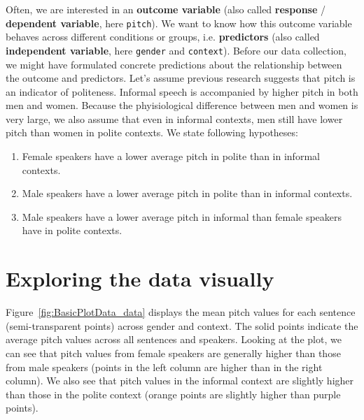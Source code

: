 \documentclass[nobib]{tufte-handout}
\begin{document}
Often, we are interested in an \textbf{outcome variable} (also called \textbf{response} / \textbf{dependent variable}, here \texttt{pitch}). We want to know how this outcome variable behaves
across different conditions or groups, i.e. \textbf{predictors} (also called \textbf{independent variable}, here \texttt{gender} and \texttt{context}). Before our data collection,
we might have formulated concrete predictions about the relationship between the outcome and predictors. Let's assume previous research suggests that pitch is an indicator of politeness. Informal speech is accompanied by higher pitch in both men and women. Because the phyisiological difference between men and women is very large, we also assume that even in informal contexts, men still have lower pitch than women in polite contexts. We state following hypotheses:

\begin{enumerate}[{H}1:]
\item Female speakers have a lower average pitch in polite than in informal contexts.
\item Male speakers have a lower average pitch in polite than in informal contexts.
\item Male speakers have a lower average pitch in informal than female speakers have in polite contexts.
\end{enumerate}

\section{Exploring the data visually}

Figure~\ref{fig:BasicPlotData_data} displays the mean pitch values for each
sentence (semi-transparent points) across gender and context.
%
%
The solid points indicate the average pitch values across all sentences and speakers.
Looking at the plot, we can see that pitch values from female speakers are generally higher
than those from male speakers (points in the left column are higher than in the right column).
We also see that pitch values in the informal context are slightly higher than those in the polite context (orange points are
slightly higher than purple points).
\end{document}
